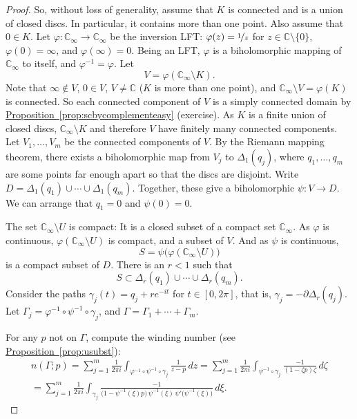 \documentclass[12pt,openany]{book}
\newcommand{\C}{{\mathbb{C}}}
\theoremstyle{plain}
\theoremstyle{remark}
\theoremstyle{definition}
\theoremstyle{exercise}
\theoremstyle{example}
\newcommand{\propref}[1]{\hyperref[#1]{Proposition~\ref*{#1}}}
\begin{document}
\begin{proof}
So, without loss of generality, assume that $K$ is connected and is a union of
closed discs.  In particular, it contains more than one point.
Also assume that $0 \in K$.
Let $\varphi \colon \C_\infty \to \C_\infty$ be the inversion
LFT\@:
$\varphi(z) = \nicefrac{1}{z}$ for $z \in \C \setminus \{ 0 \}$,
$\varphi(0) = \infty$, and $\varphi(\infty) = 0$.
Being an LFT\@, $\varphi$ is a biholomorphic
mapping of $\C_\infty$ to itself, and $\varphi^{-1} = \varphi$.  Let
\begin{equation*}
V = \varphi(\C_\infty \setminus K) .
\end{equation*}
Note that $\infty \notin V$, $0 \in V$, $V \neq \C$ ($K$ is more than one
point), and
$\C_\infty \setminus V = \varphi(K)$ is connected.
So each connected component of $V$ is a simply connected domain
by \propref{prop:scbycomplementeasy} (exercise).
As $K$ is a finite union of closed discs,
$\C_\infty \setminus K$ and therefore $V$ have finitely many connected components.
Let $V_1,\ldots,V_m$ be the connected
components of $V$.
By the Riemann mapping theorem, there exists
a biholomorphic map from $V_j$ to $\Delta_1(q_j)$,
where $q_1,\ldots,q_m$ are some points
far enough apart so that the discs are disjoint.
Write $D = \Delta_1(q_1) \cup \cdots \cup \Delta_1(q_m)$.
Together, these give
a biholomorphic $\psi \colon V \to D$.  We can arrange that $q_1=0$
and $\psi(0)=0$.

The set $\C_\infty \setminus U$ is compact: It is a closed subset of
a compact set $\C_\infty$.  As $\varphi$ is continuous,
$\varphi(\C_\infty \setminus U)$ is compact, and a subset of $V$.
And as $\psi$ is continuous,
\begin{equation*}
S = \psi\bigl(\varphi(\C_\infty \setminus U)\bigr)
\end{equation*}
is a compact subset of $D$.  There is an $r < 1$ such that
\begin{equation*}
S \subset \Delta_r(q_1) \cup \cdots \cup \Delta_r(q_m) .
\end{equation*}
Consider the paths $\gamma_j(t) = q_j + r e^{-it}$ for $t \in
[0,2\pi]$,
that is, $\gamma_j = -\partial
\Delta_r(q_j)$.
Let $\Gamma_j=\varphi^{-1} \circ \psi^{-1} \circ \gamma_j$, and $\Gamma = \Gamma_1 +
\cdots + \Gamma_m$.

For any $p$ not on $\Gamma$, compute
the winding number (see \propref{prop:usubst}):
\begin{multline*}
n(\Gamma;p) = 
\sum_{j=1}^m
\frac{1}{2\pi i}
\int_{\varphi^{-1} \circ \psi^{-1} \circ \gamma_j}
\frac{1}{z-p} \, dz
=
\sum_{j=1}^m
\frac{1}{2\pi i}
\int_{\psi^{-1} \circ \gamma_j}
\frac{-1}{(1-\zeta p) \zeta} \, d\zeta
\\
=
\sum_{j=1}^m
\frac{1}{2\pi i}
\int_{\gamma_j}
\frac{-1}{ \bigl( 1-\psi^{-1}(\xi)p \bigr)
\,
\psi^{-1}(\xi)
\,
\psi' \bigl(\psi^{-1}(\xi)\bigr)} \, d \xi .
\end{multline*}


\end{proof}
\end{document}
